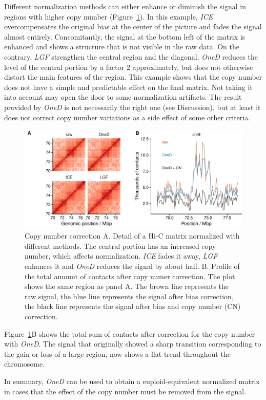 \documentclass{bioinfo}
\begin{document}
Different normalization methods can either enhance or diminish the signal
in regions with higher copy number (Figure~\ref{fig:cnv_correction}). In this
example, \textit{ICE} overcompensates the original bias at the center of the
picture and fades the signal almost entirely. Concomitantly, the signal at the
bottom left of the matrix is enhanced and shows a structure that is not visible
in the raw data. On the contrary, \textit{LGF} strengthen the central region and
the diagonal. \textit{OneD} reduces the level of the central portion by a factor
2 approximately, but does not otherwise distort the main features of the
region. This example shows that the copy number does not have a simple and
predictable effect on the final matrix. Not taking it into account may open the
door to some normalization artifacts. The result provided by \textit{OneD} is
not necessarily the right one (see Discussion), but at least it does not correct
copy number variations as a side effect of some other criteria.

\begin{figure}
\centerline{\includegraphics[width=.5\textwidth]
  {img/figure_cnv_correction.pdf}}
\caption{
Copy number correction A. Detail of a Hi-C matrix normalized with
different methods. The central portion has an increased copy number, which
affects normalization. \textit{ICE} fades it away, \textit{LGF} enhances
it and \textit{OneD} reduces the signal by about half. B. Profile of the
total amount of contacts after copy numer correction. The plot shows the
same region as panel A. The brown line represents the raw
signal, the blue line represents the signal after bias correction, the
black line represents the signal after bias and copy number (CN) correction.}
\label{fig:cnv_correction}
\end{figure}

Figure~\ref{fig:cnv_correction}B shows the total sum of contacts after
correction for the copy number with \textit{OneD}. The signal that
originally showed a sharp transition corresponding to the gain or loss of
a large region, now shows a flat trend throughout the chromosome.

In summary, \textit{OneD} can be used to obtain a euploid-equivalent normalized
matrix in cases that the effect of the copy number must be removed from the signal.
\end{document}
